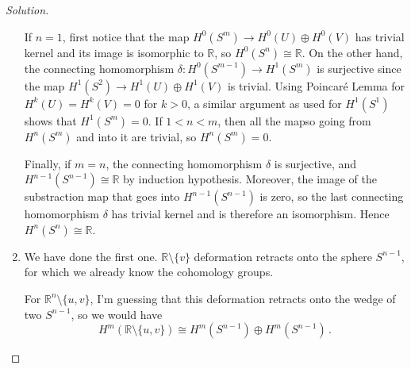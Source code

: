 \documentclass[a4paper,12pt]{article}
\newenvironment{solution}
  {\renewcommand\qedsymbol{$\blacksquare$}\begin{proof}[Solution]}
  {\end{proof}}
\theoremstyle{definition}
\begin{document}
\begin{solution}
\begin{enumerate}[label = \alph*)]
    If $n = 1$, first notice that the map $H^0(S^m) \to H^0(U) \oplus H^0(V)$ has trivial kernel and its image is isomorphic to $\mathbb{R}$, so $H^0(S^n) \cong \mathbb{R}$. On the other hand, the connecting homomorphism $\delta \colon H^0(S^{m-1}) \to H^1(S^m)$ is surjective since the map $H^1(S^2) \to H^1(U) \oplus H^1(V)$ is trivial. Using Poincaré Lemma for $H^k(U) = H^k(V) = 0$ for $k >0$, a similar argument as used for $H
   ^1(S^1)$ shows that $H^1(S^m) = 0$.  If $1 < n < m$, then all the mapso going from $H^n(S^m)$ and into it are trivial, so $H^n(S^m) = 0$. 
   
   Finally, if $m = n$, the connecting homomorphism $\delta$ is surjective, and $H^{n-1}(S^{n-1}) \cong \mathbb{R}$ by induction hypothesis. Moreover, the image of the substraction map that goes into $H^{n-1}(S^{n-1})$ is zero, so the last connecting homomorphism $\delta$ has trivial kernel and is therefore an isomorphism. Hence $H^n(S^n) \cong \mathbb{R}$. 
   \item We have done the first one. $\mathbb{R} \setminus \{v\}$ deformation retracts onto the sphere $S^{n-1}$, for which we already know the cohomology groups. 
   
   For $\mathbb{R}^n \setminus \{u, v\}$, I'm guessing that this deformation retracts onto the wedge of two $S^{n-1}$, so we would have 
   $$H^m(\mathbb{R} \setminus \{u, v\}) \cong H^m(S^{n-1}) \oplus H^m(S^{n-1}) \, .$$
\end{enumerate}
\end{solution}
\end{document}
